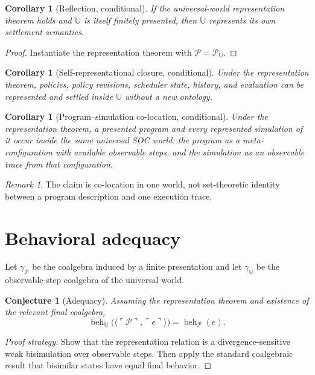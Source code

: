 \documentclass[11pt]{article}
\newtheorem{corollary}[definition]{Corollary}
\newtheorem{conjecture}[definition]{Conjecture}
\theoremstyle{remark}
\newtheorem{remark}[definition]{Remark}
\newcommand{\U}{\mathbb{U}}
\newcommand{\Pres}{\mathcal{P}}
\newcommand{\beh}{\operatorname{beh}}
\newcommand{\enc}[1]{\ulcorner #1 \urcorner}
\begin{document}
\begin{corollary}[Reflection, conditional]
If the universal-world representation theorem holds and $\U$ is itself
finitely presented, then $\U$ represents its own settlement semantics.
\end{corollary}

\begin{proof}
Instantiate the representation theorem with $\Pres=\Pres_{\U}$.
\end{proof}

\begin{corollary}[Self-representational closure, conditional]
Under the representation theorem, policies, policy revisions, scheduler state,
history, and evaluation can be represented and settled inside $\U$ without a
new ontology.
\end{corollary}

\begin{corollary}[Program--simulation co-location, conditional]
Under the representation theorem, a presented program and every represented
simulation of it occur inside the same universal SOC world: the program as a
meta-configuration with available observable steps, and the simulation as an
observable trace from that configuration.
\end{corollary}

\begin{remark}
The claim is co-location in one world, not set-theoretic identity between a
program description and one execution trace.
\end{remark}

\section{Behavioral adequacy}

Let $\gamma_{\Pres}$ be the coalgebra induced by a finite presentation and let
$\gamma_{\U}$ be the observable-step coalgebra of the universal world.

\begin{conjecture}[Adequacy]
Assuming the representation theorem and existence of the relevant final
coalgebra,
\[
  \beh_{\U}
  \bigl(\langle\enc{\Pres},\enc{e}\rangle\bigr)
  =
  \beh_{\Pres}(e).
\]
\end{conjecture}

\begin{proof}[Proof strategy]
Show that the representation relation is a divergence-sensitive weak
bisimulation over observable steps. Then apply the standard coalgebraic result
that bisimilar states have equal final behavior.
\end{proof}
\end{document}
